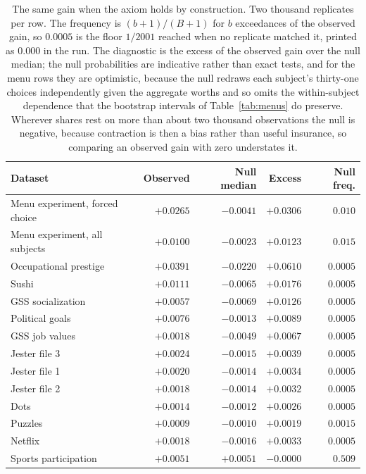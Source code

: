 \documentclass[11pt]{article}
\begin{document}
\begin{table}[ht]
\centering
\small
\begin{tabular}{lrrrr}
\toprule
Dataset & Observed & Null median & Excess & Null freq. \\
\midrule
Menu experiment, forced choice & $+0.0265$ & $-0.0041$ & $+0.0306$ & $0.010$ \\
Menu experiment, all subjects & $+0.0100$ & $-0.0023$ & $+0.0123$ & $0.015$ \\
\midrule
Occupational prestige & $+0.0391$ & $-0.0220$ & $+0.0610$ & $0.0005$ \\
Sushi & $+0.0111$ & $-0.0065$ & $+0.0176$ & $0.0005$ \\
GSS socialization & $+0.0057$ & $-0.0069$ & $+0.0126$ & $0.0005$ \\
Political goals & $+0.0076$ & $-0.0013$ & $+0.0089$ & $0.0005$ \\
GSS job values & $+0.0018$ & $-0.0049$ & $+0.0067$ & $0.0005$ \\
Jester file 3 & $+0.0024$ & $-0.0015$ & $+0.0039$ & $0.0005$ \\
Jester file 1 & $+0.0020$ & $-0.0014$ & $+0.0034$ & $0.0005$ \\
Jester file 2 & $+0.0018$ & $-0.0014$ & $+0.0032$ & $0.0005$ \\
Dots & $+0.0014$ & $-0.0012$ & $+0.0026$ & $0.0005$ \\
Puzzles & $+0.0009$ & $-0.0010$ & $+0.0019$ & $0.0015$ \\
Netflix & $+0.0018$ & $-0.0016$ & $+0.0033$ & $0.0005$ \\
\midrule
Sports participation & $+0.0051$ & $+0.0051$ & $-0.0000$ & $0.509$ \\
\bottomrule
\end{tabular}
\caption{The same gain when the axiom holds by construction. Two thousand replicates per row.
The frequency is $(b+1)/(B+1)$ for $b$ exceedances of the observed gain, so $0.0005$ is the
floor $1/2001$ reached when no replicate matched it, printed as $0.000$ in the run. The diagnostic is the excess of the observed gain over the null median; the null
probabilities are indicative rather than exact tests, and for the menu rows they are
optimistic, because the null redraws each subject's thirty-one choices independently given
the aggregate worths and so omits the within-subject dependence that the bootstrap
intervals of Table~\ref{tab:menus} do preserve. Wherever shares rest on more than about two thousand observations the null is
negative, because contraction is then a bias rather than useful insurance, so comparing
an observed gain with zero understates it.}
\label{tab:null}
\end{table}
\end{document}
